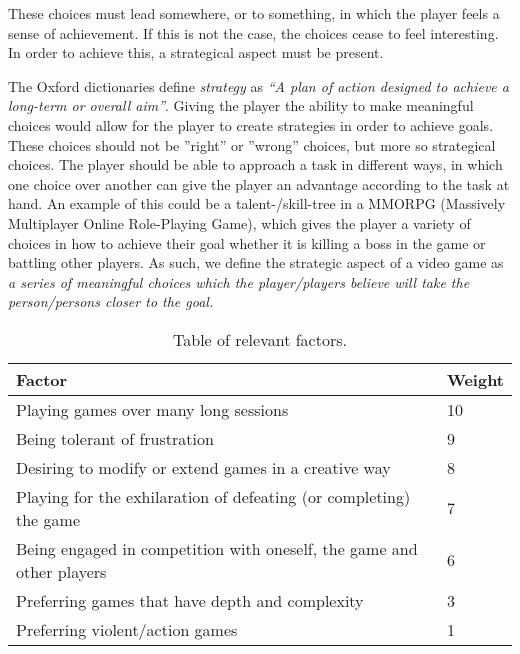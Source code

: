 These choices must lead somewhere, or to something, in which the player feels a sense of achievement. If this is not the case, the choices cease to feel interesting. In order to achieve this, a strategical aspect must be present.

The Oxford dictionaries define \textit{strategy} as \textit{``A plan of action designed to achieve a long-term or overall aim''}.\cite{strategyOx}
Giving the player the ability to make meaningful choices would allow for the player to create strategies in order to achieve goals.
These choices should not be ''right'' or ''wrong'' choices, but more so strategical choices. The player should be able to approach a task in different ways, in which one choice over another can give the player an advantage according to the task at hand. 
An example of this could be a talent-/skill-tree in a MMORPG (Massively Multiplayer Online Role-Playing Game), which gives the player a variety of choices in how to achieve their goal whether it is killing a boss in the game or battling other players.
As such, we define the strategic aspect of a video game as \emph{a series of meaningful choices which the player/players believe will take the person/persons closer to the goal.}

\begin{table}[h]
\begin{tabular}{|l|l|}
\hline
\rowcolor[HTML]{C0C0C0} 
Factor                                                                & Weight  \\ \hline
Playing games over many long sessions                                 & 10     	\\ \hline
Being tolerant of frustration                                         & 9       \\ \hline
Desiring to modify or extend games in a creative way                  & 8       \\ \hline
Playing for the exhilaration of defeating (or completing) the game    & 7       \\ \hline
Being engaged in competition with oneself, the game and other players & 6       \\ \hline
Preferring games that have depth and complexity                       & 3       \\ \hline
Preferring violent/action games                                       & 1       \\ \hline
\end{tabular}
\caption{Table of relevant factors.}
\label{tab:relevantFactors}
\end{table}
